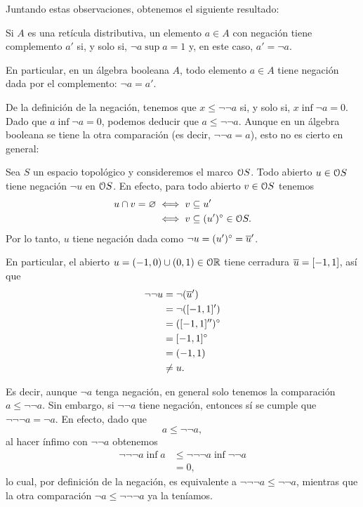 Juntando estas observaciones, obtenemos el siguiente resultado:
\begin{lemma}
  \label{lemma:complementado-ssi-supneg}
   Si $A$ es una retícula distributiva,
   un elemento $a\in A$ con negación tiene complemento $a'$
   si, y solo si, $\neg a\sup a=1$ y, en este caso, $a'=\neg a$.
\end{lemma}

En particular, en un álgebra booleana $A$, todo elemento $a\in A$
tiene negación dada por el complemento: $\neg a = a'$.

De la definición de la negación, tenemos que
$x\leq \neg\neg a$ si, y solo si, $x\inf\neg a=0$.
Dado que $a\inf\neg a=0$, podemos deducir que $a\leq\neg\neg a$.
Aunque en un álgebra booleana se tiene la otra comparación
(es decir, $\neg\neg a = a$),
esto no es cierto en general:

\begin{example}
  \label{exa:negaciones-en-espacios-top}
  Sea $S$ un espacio topológico y consideremos el marco $\cal OS$.
  Todo abierto $u\in\cal O S$ tiene negación $\neg u$ en $\cal OS$.
  En efecto, para todo abierto $v\in\cal OS$ tenemos
  \begin{align*}
        u\cap v = \emptyset
        &\iff v\subseteq u' \\
        &\iff v\subseteq (u')^\circ \in\cal OS.
  \end{align*}
  Por lo tanto, $u$ tiene negación dada como
  $\neg u = (u')^\circ = {\ol u}'$.
  
  En particular, el abierto $u=(-1,0)\cup(0,1)\in\cal O\mathbb R$
  tiene cerradura $\ol u = [-1,1]$, así que
  \begin{align*}
    \neg\neg u
    &= \neg(\ol u ') \\
    &= \neg([-1,1]') \\
    &= ([-1,1]'')^\circ \\
    &= [-1,1]^\circ \\
    &= (-1,1) \\
    &\neq u.
  \end{align*}
\end{example}

Es decir, aunque $\neg a$ tenga negación, en general
solo tenemos la comparación $a\leq\neg\neg a$.
Sin embargo, si $\neg\neg a$ tiene negación, entonces sí se
cumple que $\neg\neg\neg a=\neg a$.
En efecto, dado que
\[
  a \leq \neg\neg a
,\]
al hacer ínfimo con $\neg\neg a$ obtenemos
\begin{align*}
  \neg\neg\neg a\inf a
  &\leq \neg\neg\neg a\inf \neg\neg a  \\
  &= 0,
\end{align*}
lo cual, por definición de la negación, es equivalente a
$\neg\neg\neg a\leq\neg\neg a$, mientras que la otra comparación
$\neg a\leq\neg\neg\neg a$ ya la teníamos.

